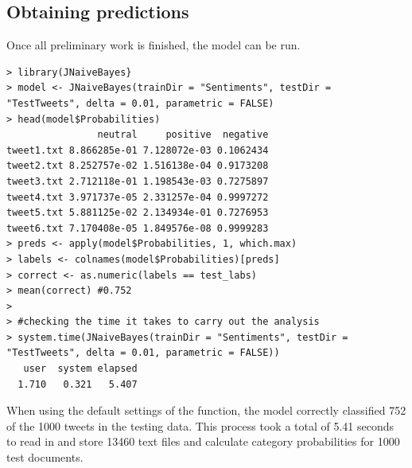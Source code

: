 \documentclass[a4paper]{article}
\begin{document}
\subsection{Obtaining predictions}
Once all preliminary work is finished, the model can be run.
{\footnotesize{
\begin{verbatim}
> library(JNaiveBayes}
> model <- JNaiveBayes(trainDir = "Sentiments", testDir = "TestTweets", delta = 0.01, parametric = FALSE)
> head(model$Probabilities)
                neutral     positive  negative
tweet1.txt 8.866285e-01 7.128072e-03 0.1062434
tweet2.txt 8.252757e-02 1.516138e-04 0.9173208
tweet3.txt 2.712118e-01 1.198543e-03 0.7275897
tweet4.txt 3.971737e-05 2.331257e-04 0.9997272
tweet5.txt 5.881125e-02 2.134934e-01 0.7276953
tweet6.txt 7.170408e-05 1.849576e-08 0.9999283
> preds <- apply(model$Probabilities, 1, which.max)
> labels <- colnames(model$Probabilities)[preds]
> correct <- as.numeric(labels == test_labs)
> mean(correct) #0.752
>
> #checking the time it takes to carry out the analysis
> system.time(JNaiveBayes(trainDir = "Sentiments", testDir = "TestTweets", delta = 0.01, parametric = FALSE))
   user  system elapsed 
  1.710   0.321   5.407 
\end{verbatim}}}
\noindent When using the default settings of the function, the model correctly classified 752 of the 1000 tweets in the testing data. This process took a total of 5.41 seconds to read in and store 13460 text files and calculate category probabilities for 1000 test documents.
\end{document}
